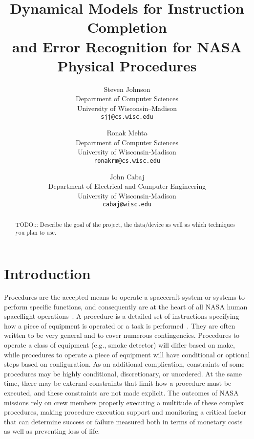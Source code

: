 \documentclass[10pt,letterpaper]{article}
\begin{document}
\title{Dynamical Models for Instruction Completion \\and Error Recognition for NASA Physical Procedures}

\author{Steven Johnson\\
Department of Computer Sciences\\
University of Wisconsin--Madison\\
{\tt\small sjj@cs.wisc.edu}
\and
Ronak Mehta\\
Department of Computer Sciences\\
University of Wisconsin-Madison\\
{\tt\small ronakrm@cs.wisc.edu}
\and
John Cabaj\\
Department of Electrical and Computer Engineering\\
University of Wisconsin-Madison\\
{\tt\small cabaj@wisc.edu}
}

\maketitle

\begin{abstract}
TODO::: Describe the goal of the project, the data/device as well as which techniques you plan to use.

\end{abstract}

\section{Introduction}

Procedures are the accepted means to operate a spacecraft system or systems to perform specific functions, and consequently are at the heart of all NASA human spaceflight operations~\cite{kortenkamp2008procedure}. A procedure is a detailed set of instructions specifying how a piece of equipment is operated or a task is performed~\cite{frank2010plans}. They are often written to be very general and to cover numerous contingencies. Procedures to operate a class of equipment (e.g., smoke detector) will differ based on make, while procedures to operate a piece of equipment will have conditional or optional steps based on configuration. As an additional complication, constraints of some procedures may be highly conditional, discretionary, or unordered. At the same time, there may be external constraints that limit how a procedure must be executed, and these constraints are not made explicit. The outcomes of NASA missions rely on crew members properly executing a multitude of these complex procedures, making procedure execution support and monitoring a critical factor that can determine success or failure measured both in terms of monetary costs as well as preventing loss of life.
\end{document}
